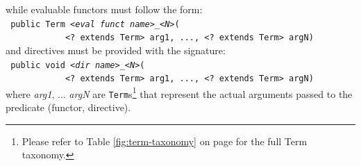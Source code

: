 \noindent while evaluable functors must follow the form:\\

{\small\tt
    public Term <\textit{eval funct name}>\_<\textit{N}>(\\
    \mbox{~~~~~~~~~~~~}<?~extends~Term> arg1, ..., <?~extends~Term> argN)
}\\

\noindent and directives must be provided with the signature:\\

{\small\tt
    public void <\textit{dir name}>\_<\textit{N}>(\\
    \mbox{~~~~~~~~~~~~}<?~extends~Term> arg1, ..., <?~extends~Term> argN)
}\\

\noindent where \textit{arg1}, ... \textit{argN} are \texttt{Term}s\footnote{%
 Please refer to Table \ref{fig:term-taxonomy} on page \pageref{fig:term-taxonomy} for the full Term taxonomy.}
that represent the actual arguments passed to the predicate (functor, directive).

